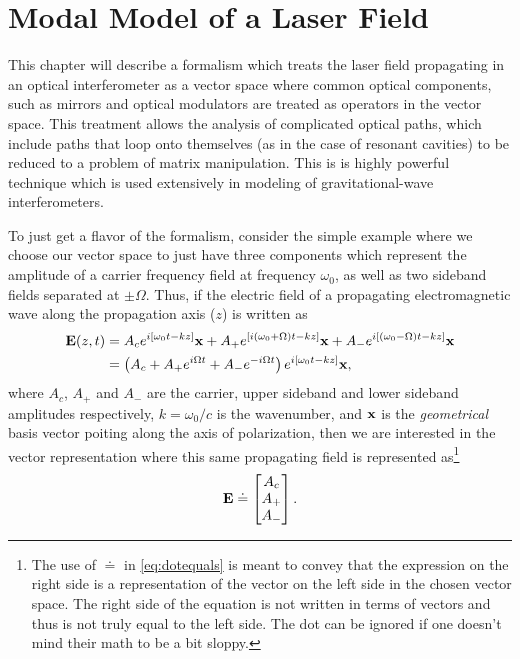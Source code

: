 

\chapter{Modal Model of a Laser Field}

This chapter will describe a formalism which treats the laser field propagating in an optical interferometer as a vector space where common optical components, such as mirrors and optical modulators are treated as operators in the vector space. %
This treatment allows the analysis of complicated optical paths, which include paths that loop onto themselves (as in the case of resonant cavities) to be reduced to a problem of matrix manipulation. %
This is is highly powerful technique which is used extensively in modeling of gravitational-wave interferometers.

To just get a flavor of the formalism, consider the simple example where we choose our vector space to just have three components which represent the amplitude of a carrier frequency field at frequency $\omega_0$, as well as two sideband fields separated at $\pm\Omega$. %
Thus, if the electric field of a propagating electromagnetic wave along the propagation axis ($z$) is written as
\begin{align*}
\mathbf{E}(z,t) &= A_c e^{i[\omega_0t -kz]}\mathbf{x} + A_+e^{[i(\omega_0+\Omega)t -kz]}\mathbf{x} + A_-e^{i[(\omega_0-\Omega)t -kz]}\mathbf{x}\\
&= \left( A_c + A_+ e^{i\Omega t}+A_-e^{-i\Omega t}\right) e^{i[\omega_0 t-kz]}\mathbf{x},
\end{align*}
where $A_c$, $A_+$ and $A_-$ are the carrier, upper sideband and lower sideband amplitudes respectively, $k=\omega_0/c$ is the wavenumber, and $\mathbf{x}$ is the \emph{geometrical} basis vector poiting along the axis of polarization, then we are interested in the vector representation where this same propagating field is represented as\footnote{The use of $\doteq$ in \ref{eq:dotequals} is meant to convey that the expression on the right side is a representation of the vector on the left side in the chosen vector space. %
The right side of the equation is not written in terms of vectors and thus is not truly equal to the left side. %
The dot can be ignored if one doesn't mind their math to be a bit sloppy.} 
\begin{equation}
\label{eq:dotequals}
\mathbf{E} \doteq \left[\begin{matrix} A_c \\ A_+ \\ A_- \end{matrix}\right].
\end{equation}

